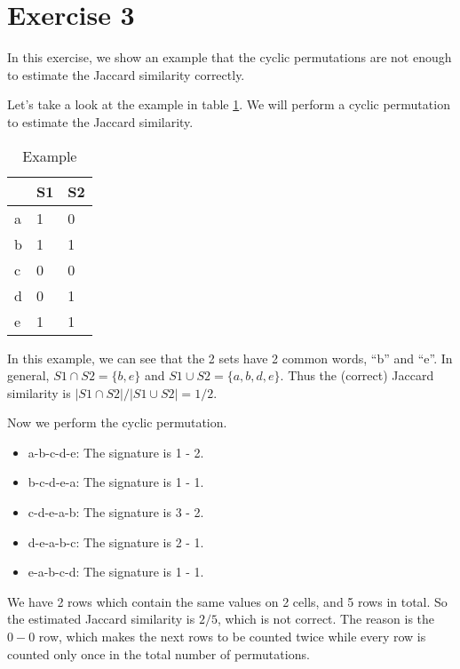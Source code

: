 \section*{Exercise 3}
In this exercise, we show an example that the cyclic permutations are not enough to estimate the Jaccard similarity correctly.

Let's take a look at the example in table \ref{example}. We will perform a cyclic permutation to estimate the Jaccard similarity.

\begin{table}[h]
  \centering
\caption{Example}
\label{example}
\begin{tabular}{@{}lll@{}}
  \toprule
  & S1 & S2 \\ \midrule
a & 1  & 0  \\
b & 1  & 1  \\
c & 0  & 0  \\
d & 0  & 1  \\
e & 1  & 1  \\ \bottomrule
\end{tabular}
\end{table}

In this example, we can see that the 2 sets have 2 common words, ``b'' and ``e''. In general, $S1 \cap S2 = \{b,e\}$ and $S1 \cup S2 = \{a,b,d,e\}$. Thus the (correct) Jaccard similarity is $|S1 \cap S2| / |S1 \cup S2| = 1/2$.

Now we perform the cyclic permutation. 

\begin{itemize}
    \item a-b-c-d-e: The signature is 1 - 2.
    \item b-c-d-e-a: The signature is 1 - 1.
    \item c-d-e-a-b: The signature is 3 - 2.
    \item d-e-a-b-c: The signature is 2 - 1.
    \item e-a-b-c-d: The signature is 1 - 1.
\end{itemize}

We have 2 rows which contain the same values on 2 cells, and 5 rows in total. So the estimated Jaccard similarity is $2/5$, which is not correct. The reason is the $0 - 0$ row, which makes the next rows to be counted twice while every row is counted only once in the total number of permutations.

